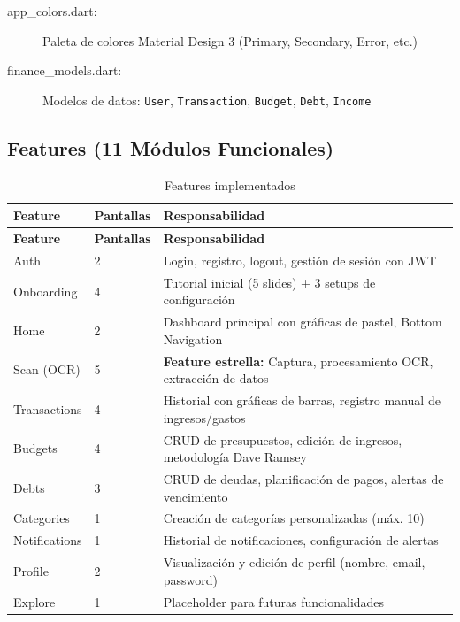 \begin{description}
    \item[app\_colors.dart:] Paleta de colores Material Design 3 (Primary, Secondary, Error, etc.)
    \item[finance\_models.dart:] Modelos de datos: \texttt{User}, \texttt{Transaction}, \texttt{Budget}, \texttt{Debt}, \texttt{Income}
\end{description}

\subsection{Features (11 Módulos Funcionales)}

\begin{longtable}{|p{2.8cm}|p{1.8cm}|p{7.6cm}|}
\caption{Features implementados} \\
\hline
\textbf{Feature} & \textbf{Pantallas} & \textbf{Responsabilidad} \\
\hline
\endfirsthead
\hline
\textbf{Feature} & \textbf{Pantallas} & \textbf{Responsabilidad} \\
\hline
\endhead

Auth & 2 & Login, registro, logout, gestión de sesión con JWT \\
\hline
Onboarding & 4 & Tutorial inicial (5 slides) + 3 setups de configuración \\
\hline
Home & 2 & Dashboard principal con gráficas de pastel, Bottom Navigation \\
\hline
Scan (OCR) & 5 & \textbf{Feature estrella:} Captura, procesamiento OCR, extracción de datos \\
\hline
Transactions & 4 & Historial con gráficas de barras, registro manual de ingresos/gastos \\
\hline
Budgets & 4 & CRUD de presupuestos, edición de ingresos, metodología Dave Ramsey \\
\hline
Debts & 3 & CRUD de deudas, planificación de pagos, alertas de vencimiento \\
\hline
Categories & 1 & Creación de categorías personalizadas (máx. 10) \\
\hline
Notifications & 1 & Historial de notificaciones, configuración de alertas \\
\hline
Profile & 2 & Visualización y edición de perfil (nombre, email, password) \\
\hline
Explore & 1 & Placeholder para futuras funcionalidades \\
\hline
\end{longtable}

